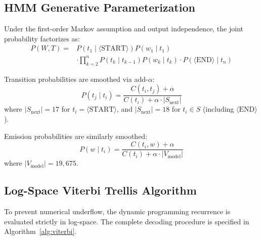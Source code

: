 \documentclass[conference]{IEEEtran}
\begin{document}
\subsection{HMM Generative Parameterization}
Under the first-order Markov assumption and output independence, the joint probability factorizes as:
\begin{equation}
\begin{aligned}
P(W, T) = & P(t_1 \mid \langle\text{START}\rangle) P(w_1 \mid t_1) \\
& \cdot \prod_{k=2}^n P(t_k \mid t_{k-1}) P(w_k \mid t_k) \cdot P(\langle\text{END}\rangle \mid t_n)
\end{aligned}
\end{equation}

Transition probabilities are smoothed via add-$\alpha$:
\begin{equation}
P(t_j \mid t_i) = \frac{C(t_i, t_j) + \alpha}{C(t_i) + \alpha \cdot |S_{\text{next}}|}
\end{equation}
where $|S_{\text{next}}| = 17$ for $t_i = \langle\text{START}\rangle$, and $|S_{\text{next}}| = 18$ for $t_i \in S$ (including $\langle\text{END}\rangle$).

Emission probabilities are similarly smoothed:
\begin{equation}
P(w \mid t_i) = \frac{C(t_i, w) + \alpha}{C(t_i) + \alpha \cdot |V_{\text{model}}|}
\end{equation}
where $|V_{\text{model}}| = 19,675$.

\subsection{Log-Space Viterbi Trellis Algorithm}
To prevent numerical underflow, the dynamic programming recurrence is evaluated strictly in log-space. The complete decoding procedure is specified in Algorithm~\ref{alg:viterbi}.
\end{document}
